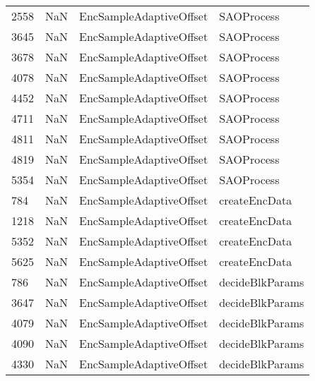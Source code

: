 \begin{tabular}{llll}
2558 &                   NaN &    EncSampleAdaptiveOffset &                                SAOProcess \\
3645 &                   NaN &    EncSampleAdaptiveOffset &                                SAOProcess \\
3678 &                   NaN &    EncSampleAdaptiveOffset &                                SAOProcess \\
4078 &                   NaN &    EncSampleAdaptiveOffset &                                SAOProcess \\
4452 &                   NaN &    EncSampleAdaptiveOffset &                                SAOProcess \\
4711 &                   NaN &    EncSampleAdaptiveOffset &                                SAOProcess \\
4811 &                   NaN &    EncSampleAdaptiveOffset &                                SAOProcess \\
4819 &                   NaN &    EncSampleAdaptiveOffset &                                SAOProcess \\
5354 &                   NaN &    EncSampleAdaptiveOffset &                                SAOProcess \\
784  &                   NaN &    EncSampleAdaptiveOffset &                             createEncData \\
1218 &                   NaN &    EncSampleAdaptiveOffset &                             createEncData \\
5352 &                   NaN &    EncSampleAdaptiveOffset &                             createEncData \\
5625 &                   NaN &    EncSampleAdaptiveOffset &                             createEncData \\
786  &                   NaN &    EncSampleAdaptiveOffset &                           decideBlkParams \\
3647 &                   NaN &    EncSampleAdaptiveOffset &                           decideBlkParams \\
4079 &                   NaN &    EncSampleAdaptiveOffset &                           decideBlkParams \\
4090 &                   NaN &    EncSampleAdaptiveOffset &                           decideBlkParams \\
4330 &                   NaN &    EncSampleAdaptiveOffset &                           decideBlkParams \\

\end{tabular}

